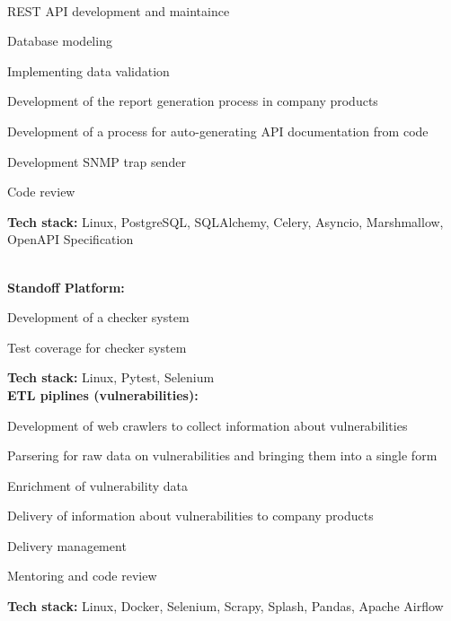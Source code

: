 \documentclass[a4paper]{MagicalCV}
\begin{document}
\hfill
\begin{minipage}[t]{0.66\textwidth} 


 \\
\vspace{\topsep} %
\begin{tightemize}
  \item REST API development and maintaince
  \item Database modeling
  \item Implementing data validation
  \item Development of the report generation process in company products
  \item Development of a process for auto-generating API documentation from code
  \item Development SNMP trap sender
  \item Code review
\end{tightemize}
\textbf{Tech stack:} Linux, PostgreSQL, SQLAlchemy, Celery, Asyncio, Marshmallow, OpenAPI Specification
\sectionsep

 \\
\vspace{\topsep} %
\textbf{Standoff Platform:}
\begin{tightemize}
  \item Development of a checker system
  \item Test coverage for checker system
\end{tightemize}
\textbf{Tech stack:} Linux, Pytest, Selenium \\
\textbf{ETL piplines (vulnerabilities):}
\begin{tightemize}
  \item Development of web crawlers to collect information about vulnerabilities
  \item Parsering for raw data on vulnerabilities and bringing them into a single form
  \item Enrichment of vulnerability data
  \item Delivery of information about vulnerabilities to company products
  \item Delivery management
  \item Mentoring and code review
\end{tightemize}
\textbf{Tech stack:} Linux, Docker, Selenium, Scrapy, Splash, Pandas, Apache Airflow
\sectionsep


\end{minipage} 
\end{document}
